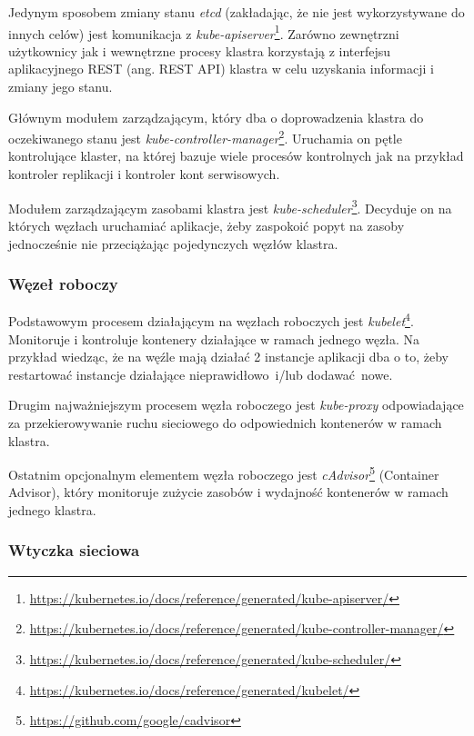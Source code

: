 \documentclass[a4paper,12pt,twoside,openany]{report}
\DeclareRobustCommand{\href}[2]{#2\footnote{\url{#1}}}
\begin{document}
Jedynym sposobem zmiany stanu \emph{etcd} (zakładając, że nie jest
wykorzystywane do innych celów) jest komunikacja z
\href{https://kubernetes.io/docs/reference/generated/kube-apiserver/}{\emph{kube-apiserver}}.
Zarówno zewnętrzni użytkownicy jak i wewnętrzne procesy klastra
korzystają z interfejsu aplikacyjnego REST (ang. REST API) klastra w
celu uzyskania informacji i zmiany jego stanu.

Głównym modułem zarządzającym, który dba o doprowadzenia klastra do
oczekiwanego stanu jest
\href{https://kubernetes.io/docs/reference/generated/kube-controller-manager/}{\emph{kube-controller-manager}}.
Uruchamia on pętle kontrolujące klaster, na której bazuje wiele procesów
kontrolnych jak na przykład kontroler replikacji i kontroler kont
serwisowych.

Modułem zarządzającym zasobami klastra jest
\href{https://kubernetes.io/docs/reference/generated/kube-scheduler/}{\emph{kube-scheduler}}.
Decyduje on na których węzłach uruchamiać aplikacje, żeby zaspokoić
popyt na zasoby jednocześnie nie przeciążając pojedynczych węzłów
klastra.

\hypertarget{wux119zeux142-roboczy}{%
\subsubsection{Węzeł roboczy}\label{wux119zeux142-roboczy}}

Podstawowym procesem działającym na węzłach roboczych jest
\href{https://kubernetes.io/docs/reference/generated/kubelet/}{\emph{kubelet}}.
Monitoruje i kontroluje kontenery działające w ramach jednego węzła. Na
przykład wiedząc, że na węźle mają działać 2 instancje aplikacji dba o
to, żeby restartować instancje działające nieprawidłowo~i/lub
dodawać~nowe.

Drugim najważniejszym procesem węzła roboczego jest \emph{kube-proxy}
odpowiadające za przekierowywanie ruchu sieciowego do odpowiednich
kontenerów w ramach klastra.

Ostatnim opcjonalnym elementem węzła roboczego jest
\href{https://github.com/google/cadvisor}{\emph{cAdvisor}} (Container
Advisor), który monitoruje zużycie zasobów i wydajność kontenerów w
ramach jednego klastra.

\hypertarget{wtyczka-sieciowa}{%
\subsubsection{Wtyczka sieciowa}\label{wtyczka-sieciowa}}
\end{document}
